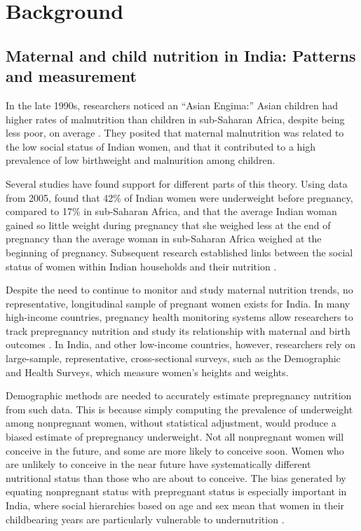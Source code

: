 \documentclass[12pt]{article}
\begin{document}
\section{Background}

\subsection{Maternal and child nutrition in India: Patterns and measurement}

In the late 1990s, researchers noticed an ``Asian Engima:'' Asian children had higher rates of malnutrition than children in sub-Saharan Africa, despite being less poor, on average \citep{ramalingaswami1996commentary, underwood2002health}.  They posited that maternal malnutrition was related to the low social status of Indian women, and that it contributed to a high prevalence of low birthweight and malnurition among children.  

Several studies have found support for different parts of this theory.  Using data from 2005, \cite{coffey2015prepregnancy} found that 42\% of Indian women were underweight before pregnancy, compared to 17\% in sub-Saharan Africa, and that the average Indian woman gained so little weight during pregnancy that she weighed less at the end of pregnancy than the average woman in sub-Saharan Africa weighed at the beginning of pregnancy.  Subsequent research established links between the social status of women within Indian households and their nutrition \citep{coffey2022mothers, hathi2021women}. 

Despite the need to continue to monitor and study maternal nutrition trends, no representative, longitudinal sample of pregnant women exists for India.  In many high-income countries, pregnancy health monitoring systems allow researchers to track prepregnancy nutrition and study its relationship with maternal and birth outcomes \citep{cornish2024maternal}.  In India, and other low-income countries, however, researchers rely on large-sample, representative, cross-sectional surveys, such as the Demographic and Health Surveys, which measure women's heights and weights.  

Demographic methods are needed to accurately estimate prepregnancy nutrition from such data.  This is because simply computing the prevalence of underweight among nonpregnant women, without statistical adjustment, would produce a biased estimate of prepregnancy underweight.  Not all nonpregnant women will conceive in the future, and some are more likely to conceive soon.  Women who are unlikely to conceive in the near future have systematically different nutritional status than those who are about to conceive. The bias generated by equating nonpregnant status with prepregnant status is especially important in India, where social hierarchies based on age and sex mean that women in their childbearing years are particularly vulnerable to undernutrition \citep{gupta1995life, coffey2021neonatal, coffey2022mothers}.
\end{document}
